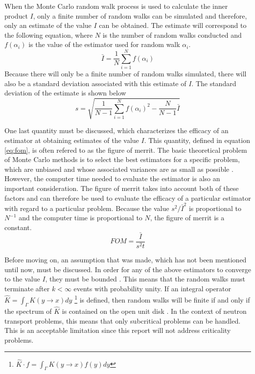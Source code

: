 When the Monte Carlo random walk process is used to calculate the inner product
$I$, only a finite number of random walks can be simulated and therefore, only 
an estimate of the value $I$ can be obtained. The estimate will
correspond to the following equation, where $N$ is the number of random walks
conducted and $f(\alpha_i)$ is the value of the estimator used for random
walk $\alpha_i$.
\begin{equation}
  \bar{I} = \frac{1}{N} \sum_{i=1}^N f(\alpha_i)
  \label{eq:inner_product_estimate}
\end{equation}
Because there will only be a finite number of random walks simulated, there
will also be a standard deviation associated with this estimate of $I$. The 
standard deviation of the estimate is shown below
\begin{equation}
  s = \sqrt{\frac{1}{N-1}\sum_{i=1}^N f(\alpha_i)^2 - \frac{N}{N-1}\bar{I}}
  \label{eq:inner_product_stddev}
\end{equation}

One last quantity must be discussed, which characterizes the efficacy of
an estimator at obtaining estimates of the value $I$. This quantity, defined
in equation \ref{eq:fom}, is often refered to as the figure of merrit. The
basic theoretical problem of Monte Carlo methods is to select the best
estimators for a specific problem, which are unbiased and whose associated
variances are as small as possible \citep{spanier_monte_1969}. However, the 
computer time needed to evaluate the estimator is also an important 
consideration. The figure of merrit takes into account both of these factors
and can therefore be used to evaluate the efficacy of a particular estimator
with regard to a particular problem. Because the value $s^2/\bar{I}^2$ is
proportional to $N^{-1}$ and the computer time is proportional to $N$, the
figure of merrit is a constant.
\begin{equation}
  FOM = \frac{\bar{I}}{s^2t}
  \label{eq:fom}
\end{equation}

Before moving on, an assumption that was made, which has not been mentioned
until now, must be discussed. In order for any of the above estimators to 
converge to the value $I$, they must be bounded \citep{spanier_monte_1969}. This
means that the random walks must terminate after $k < \infty$ events with 
probability unity. If an integral operator $\hat{K} = \int_{\Gamma} K(y \to x)dy$
\footnote{$\hat{K} \cdot f = \int_{\Gamma} K(y \to x)f(y)dy$} is defined, then 
random walks will be finite if and only if the spectrum of $\hat{K}$ is 
contained on the open unit disk \citep{spanier_monte_1969}. In the context of 
neutron transport problems, this means that only subcritical problems can be 
handled. This is an acceptable limitation since this report will not address 
criticality problems.

